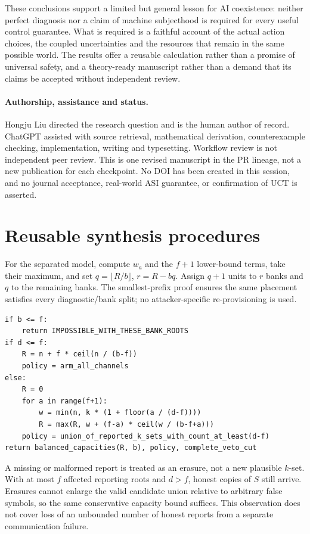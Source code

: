 These conclusions support a limited but general lesson for AI coexistence: neither perfect diagnosis nor a claim of machine subjecthood is required for every useful control guarantee. What is required is a faithful account of the actual action choices, the coupled uncertainties and the resources that remain in the same possible world. The results offer a reusable calculation rather than a promise of universal safety, and a theory-ready manuscript rather than a demand that its claims be accepted without independent review.

\paragraph{Authorship, assistance and status.}
Hongju Liu directed the research question and is the human author of record. ChatGPT assisted with source retrieval, mathematical derivation, counterexample checking, implementation, writing and typesetting. Workflow review is not independent peer review. This is one revised manuscript in the PR lineage, not a new publication for each checkpoint. No DOI has been created in this session, and no journal acceptance, real-world ASI guarantee, or confirmation of UCT is asserted.

\appendix
\section{Reusable synthesis procedures}
For the separated model, compute $w_a$ and the $f+1$ lower-bound terms, take their maximum, and set $q=\lfloor R/b\rfloor$, $r=R-bq$. Assign $q+1$ units to $r$ banks and $q$ to the remaining banks. The smallest-prefix proof ensures the same placement satisfies every diagnostic/bank split; no attacker-specific re-provisioning is used.

\begin{lstlisting}[caption={Separable-role synthesis; all inputs must refer to one validated episode.}]
if b <= f:
    return IMPOSSIBLE_WITH_THESE_BANK_ROOTS
if d <= f:
    R = n + f * ceil(n / (b-f))
    policy = arm_all_channels
else:
    R = 0
    for a in range(f+1):
        w = min(n, k * (1 + floor(a / (d-f))))
        R = max(R, w + (f-a) * ceil(w / (b-f+a)))
    policy = union_of_reported_k_sets_with_count_at_least(d-f)
return balanced_capacities(R, b), policy, complete_veto_cut
\end{lstlisting}
A missing or malformed report is treated as an erasure, not a new plausible $k$-set. With at most $f$ affected reporting roots and $d>f$, honest copies of $S$ still arrive. Erasures cannot enlarge the valid candidate union relative to arbitrary false symbols, so the same conservative capacity bound suffices. This observation does not cover loss of an unbounded number of honest reports from a separate communication failure.

